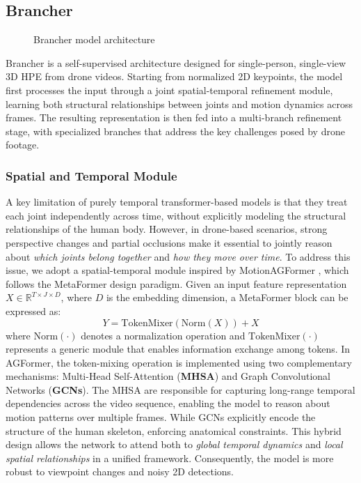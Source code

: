 \documentclass[11pt,a4paper,twocolumn]{article}
\newcommand{\usesvg}[3]{
    \IfFileExists{#1}
    {}
    {} 
}
\newcommand{\useSvgWithCaption}[5][]{
    \begin{figure}[t!]
        \centering
        \usesvg{#2}{#3}{#4}
        \caption{#5}
        \ifthenelse{\equal{#1}{}}{}{%
            \label{#1}%
        }%
    \end{figure}
}
\begin{document}
\subsection{Brancher}
\useSvgWithCaption[fig:brancher]{Images/brancher.svg}{1.0}{1.0}{Brancher model architecture}
Brancher is a self-supervised architecture designed for single-person, single-view 3D HPE from drone videos. Starting from normalized 2D keypoints, 
the model first processes the input through a joint spatial-temporal refinement module, learning both structural relationships between joints and motion 
dynamics across frames.
The resulting representation is then fed into a multi-branch refinement stage, with specialized branches that address the key challenges posed by drone footage.

\subsubsection{Spatial and Temporal Module}
A key limitation of purely temporal transformer-based models is that they treat each joint independently across time, without explicitly modeling the structural relationships of the human body. 
However, in drone-based scenarios, strong perspective changes and partial occlusions make it essential to jointly reason about 
\textit{which joints belong together} and \textit{how they move over time}.
To address this issue, we adopt a spatial-temporal module inspired by MotionAGFormer \cite{mehraban2024motionagformer}, which follows the MetaFormer design paradigm.
Given an input feature representation \( X \in \mathbb{R}^{T \times J \times D} \), where \( D \) is the embedding dimension, a MetaFormer block can be expressed as:
\begin{equation}
    Y = \text{TokenMixer}(\text{Norm}(X)) + X
\end{equation}
where \( \text{Norm}(\cdot) \) denotes a normalization operation and \( \text{TokenMixer}(\cdot) \) represents a generic module that enables information exchange among tokens.
In AGFormer, the token-mixing operation is implemented using two complementary mechanisms: Multi-Head Self-Attention (\textbf{MHSA}) and Graph Convolutional Networks (\textbf{GCNs}). 
The MHSA are responsible for capturing long-range temporal dependencies across the video sequence, enabling the model to reason about motion patterns over multiple frames.
While GCNs explicitly encode the structure of the human skeleton, enforcing anatomical constraints.
This hybrid design allows the network to attend both to \textit{global temporal dynamics} and \textit{local spatial relationships} in a unified framework.
Consequently, the model is more robust to viewpoint changes and noisy 2D detections.
\end{document}

